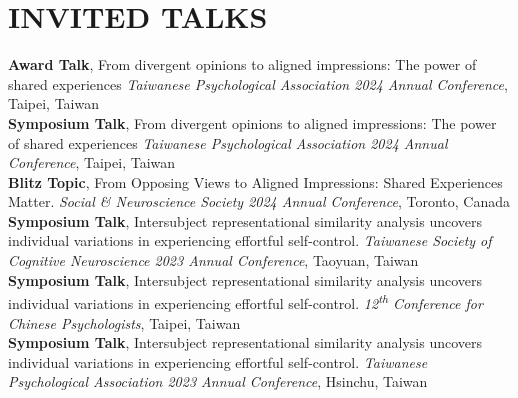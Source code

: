 \documentclass[a4paper,12pt]{article}
\newcommand{\sectionspace}{0pt} %
\newcommand{\itemspace}{7pt} %
\begin{document}
\section*{INVITED TALKS}
\textbf{Award Talk}, From divergent opinions to aligned impressions: The power of shared experiences  \textit{Taiwanese Psychological Association 2024 Annual Conference}, Taipei, Taiwan \\[\itemspace]
\textbf{Symposium Talk}, From divergent opinions to aligned impressions: The power of shared experiences  \textit{Taiwanese Psychological Association 2024 Annual Conference}, Taipei, Taiwan \\[\itemspace]
\textbf{Blitz Topic},  From Opposing Views to Aligned Impressions: Shared Experiences Matter.  \textit{Social \& Neuroscience Society 2024 Annual Conference}, Toronto, Canada \\[\itemspace]
\textbf{Symposium Talk}, Intersubject representational similarity analysis uncovers individual variations in experiencing effortful self-control. \textit{Taiwanese Society of Cognitive Neuroscience 2023 Annual Conference}, Taoyuan, Taiwan \\[\itemspace]
\textbf{Symposium Talk}, Intersubject representational similarity analysis uncovers individual variations in experiencing effortful self-control.  \textit{12\textsuperscript{th} Conference for Chinese Psychologists}, Taipei, Taiwan \\[\itemspace]
\textbf{Symposium Talk}, Intersubject representational similarity analysis uncovers individual variations in experiencing effortful self-control.  \textit{Taiwanese Psychological Association 2023 Annual Conference}, Hsinchu, Taiwan 

\vspace{\sectionspace}
\end{document}

